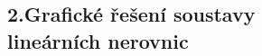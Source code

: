 \documentclass[preview]{standalone}
\begin{document}
\begin{center}
\centering \section*{2.Grafické řešení soustavy\\ lineárních nerovnic}
\end{center}
\end{document}
